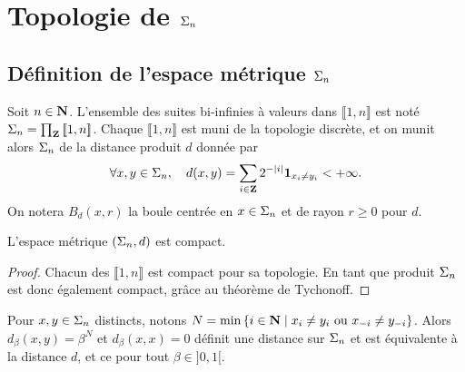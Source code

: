 \section{Topologie de $\Sigma_n$}

  \subsection{Définition de l'espace métrique $\Sigma_n$}

  \begin{definition}
    \label{def:topo_sn}
    \leanok
    Soit $n \in \mathbf N$.
    L'ensemble des suites bi-infinies à valeurs dans $\llbracket 1, n\rrbracket$ est noté $\Sigma_n = \prod_{\mathbf Z}{[\![ 1, n]\!]}$.
    Chaque $\llbracket 1, n\rrbracket$ est muni de la topologie discrète,
    et on munit alors $\Sigma_n$ de la distance produit $d$ donnée par
    $$\forall x, y \in \Sigma_n,\hspace{1em} d(x, y) = \sum_{i\in\mathbf Z}{2^{-|i|}\mathbf{1}_{x_i \not= y_i}} < +\infty.$$
    On notera $B_d(x, r)$ la boule centrée en $x \in \Sigma_n$ et de rayon $r \geq 0$ pour $d$.
  \end{definition}

  \begin{proposition}
    \label{prop:sn_compact}
    \leanok
    L'espace métrique $(\Sigma_n, d)$ est compact.
  \end{proposition}

  \begin{proof}
    \leanok
    Chacun des $\llbracket 1, n\rrbracket$ est compact pour sa topologie.
    En tant que produit $\Sigma_n$ est donc également compact, grâce au théorème de Tychonoff.
  \end{proof}

  \begin{remark}
    \label{rm:dist_equiv}
    Pour $x, y \in \Sigma_n$ distincts, notons $N = \min\left\{i \in \mathbf N \mid x_i \not= y_i \text{ ou } x_{-i} \not= y_{-i}\right\}$.
    Alors $d_{\beta}(x, y) = \beta^N$ et $d_{\beta}(x, x) = 0$ définit une distance sur $\Sigma_n$ et est équivalente à la distance $d$,
    et ce pour tout $\beta \in ]0, 1[$.
  \end{remark}

